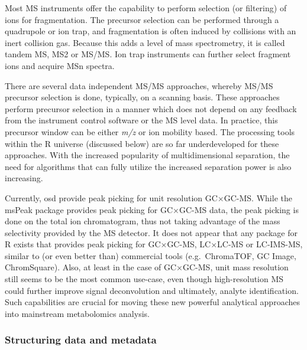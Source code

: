 \documentclass[]{article}
\begin{document}
Most MS instruments offer the capability to perform selection (or filtering) of ions for fragmentation. The precursor selection can be performed through a quadrupole or ion trap, and fragmentation is often induced by collisions with an inert collision gas. Because this adds a level of mass spectrometry, it is called tandem MS, MS2 or MS/MS. Ion trap instruments can further select fragment ions and acquire MSn spectra.

There are several data independent MS/MS approaches, whereby MS/MS precursor selection is done, typically, on a scanning basis. These approaches perform precursor selection in a manner which does not depend on any feedback from the instrument control software or the MS level data. In practice, this precursor window can be either \emph{m/z} or ion mobility based. The processing tools within the R universe (discussed below) are so far underdeveloped for these approaches. With the increased popularity of multidimensional separation, the need for algorithms that can fully utilize the increased separation power is also increasing.

Currently, osd provide peak picking for unit resolution GC×GC-MS. While the msPeak package provides peak picking for GC×GC-MS data, the peak picking is done on the total ion chromatogram, thus not taking advantage of the mass selectivity provided by the MS detector. It does not appear that any package for R exists that provides peak picking for GC×GC-MS, LC×LC-MS or LC-IMS-MS, similar to (or even better than) commercial tools (e.g.~ChromaTOF, GC Image, ChromSquare). Also, at least in the case of GC×GC-MS, unit mass resolution still seems to be the most common use-case, even though high-resolution MS could further improve signal deconvolution and ultimately, analyte identification. Such capabilities are crucial for moving these new powerful analytical approaches into mainstream metabolomics analysis.

\hypertarget{structuring-data-and-metadata}{%
\subsubsection{Structuring data and metadata}\label{structuring-data-and-metadata}}
\end{document}
